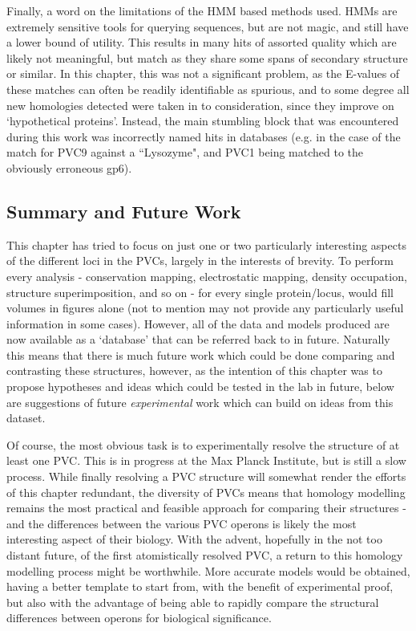 Finally, a word on the limitations of the HMM based methods used. HMMs are extremely sensitive tools for querying sequences, but are not magic, and still have a lower bound of utility. This results in many hits of assorted quality which are likely not meaningful, but match as they share some spans of secondary structure or similar. In this chapter, this was not a significant problem, as the E-values of these matches can often be readily identifiable as spurious, and to some degree all new homologies detected were taken in to consideration, since they improve on `hypothetical proteins'. Instead, the main stumbling block that was encountered during this work was incorrectly named hits in databases (e.g. in the case of the match for PVC9 against a ``Lysozyme", and PVC1 being matched to the obviously erroneous gp6).

\subsection{Summary and Future Work}
This chapter has tried to focus on just one or two particularly interesting aspects of the different loci in the PVCs, largely in the interests of brevity. To perform every analysis - conservation mapping, electrostatic mapping, density occupation, structure superimposition, and so on - for every single protein/locus, would fill volumes in figures alone (not to mention may not provide any particularly useful information in some cases). However, all of the data and models produced are now available as a `database' that can be referred back to in future. Naturally this means that there is much future work which could be done comparing and contrasting these structures, however, as the intention of this chapter was to propose hypotheses and ideas which could be tested in the lab in future, below are suggestions of future \emph{experimental} work which can build on ideas from this dataset.

Of course, the most obvious task is to experimentally resolve the structure of at least one PVC. This is in progress at the Max Planck Institute, but is still a slow process. While finally resolving a PVC structure will somewhat render the efforts of this chapter redundant, the diversity of PVCs means that homology modelling remains the most practical and feasible approach for comparing their structures - and the differences between the various PVC operons is likely the most interesting aspect of their biology. With the advent, hopefully in the not too distant future, of the first atomistically resolved PVC, a return to this homology modelling process might be worthwhile. More accurate models would be obtained, having a better template to start from, with the benefit of experimental proof, but also with the advantage of being able to rapidly compare the structural differences between operons for biological significance.

